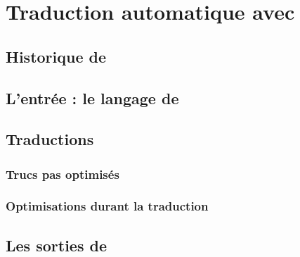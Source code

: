 \documentclass[a4paper,12pt,oneside]{extbook}
\begin{document}
\chapter{Traduction automatique avec \touist}\label{chap:touist}

\section{Historique de \touist}




\section{L'entrée : le langage de \touist}





\section{Traductions}
\subsection{Trucs pas optimisés}
\subsection{Optimisations durant la traduction}
\section{Les sorties de \touist}




\end{document}
